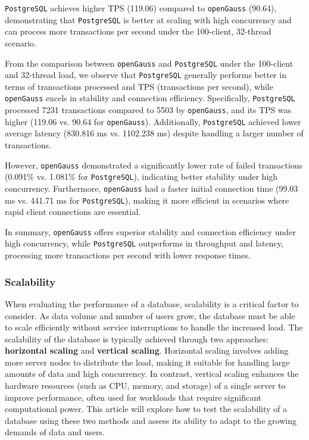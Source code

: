 \documentclass[12pt,a4paper,cs4size]{ctexart}
\begin{document}
\texttt{PostgreSQL} achieves higher TPS (119.06) compared to \texttt{openGauss} (90.64), demonstrating that \texttt{PostgreSQL} is better at scaling with high concurrency and can process more transactions per second under the 100-client, 32-thread scenario.

\vspace{0.5cm}

From the comparison between \texttt{openGauss} and \texttt{PostgreSQL} under the 100-client and 32-thread load, we observe that \texttt{PostgreSQL} generally performs better in terms of transactions processed and TPS (transactions per second), while \texttt{openGauss} excels in stability and connection efficiency. Specifically, \texttt{PostgreSQL} processed 7231 transactions compared to 5503 by \texttt{openGauss}, and its TPS was higher (119.06 vs. 90.64 for \texttt{openGauss}). Additionally, \texttt{PostgreSQL} achieved lower average latency (830.816 ms vs. 1102.238 ms) despite handling a larger number of transactions.

However, \texttt{openGauss} demonstrated a significantly lower rate of failed transactions (0.091\% vs. 1.081\% for \texttt{PostgreSQL}), indicating better stability under high concurrency. Furthermore, \texttt{openGauss} had a faster initial connection time (99.03 ms vs. 441.71 ms for \texttt{PostgreSQL}), making it more efficient in scenarios where rapid client connections are essential.

In summary, \texttt{openGauss} offers superior stability and connection efficiency under high concurrency, while \texttt{PostgreSQL} outperforms in throughput and latency, processing more transactions per second with lower response times.

\newpage

\subsubsection*{Scalability}


When evaluating the performance of a database, scalability is a critical factor to consider. As data volume and number of users grow, the database must be able to scale efficiently without service interruptions to handle the increased load. The scalability of the database is typically achieved through two approaches: \textbf{horizontal scaling} and \textbf{vertical scaling}. Horizontal scaling involves adding more server nodes to distribute the load, making it suitable for handling large amounts of data and high concurrency. In contrast, vertical scaling enhances the hardware resources (such as CPU, memory, and storage) of a single server to improve performance, often used for workloads that require significant computational power. This article will explore how to test the scalability of a database using these two methods and assess its ability to adapt to the growing demands of data and users.
\end{document}
